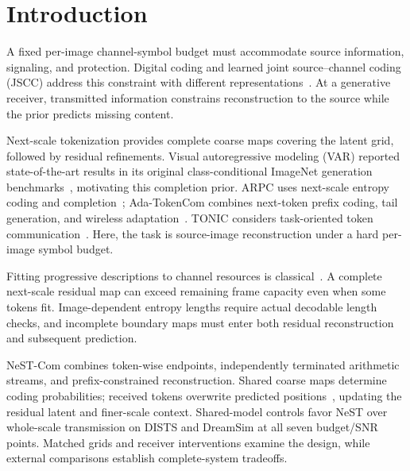 \section{Introduction}
A fixed per-image channel-symbol budget must accommodate source information, signaling, and protection. Digital coding and learned joint source--channel coding (JSCC) address this constraint with different representations~\cite{deepjscc,swinjscc}. At a generative receiver, transmitted information constrains reconstruction to the source while the prior predicts missing content.

Next-scale tokenization provides complete coarse maps covering the latent grid, followed by residual refinements. Visual autoregressive modeling (VAR) reported state-of-the-art results in its original class-conditional ImageNet generation benchmarks~\cite{var}, motivating this completion prior. ARPC uses next-scale entropy coding and completion~\cite{arpc}; Ada-TokenCom combines next-token prefix coding, tail generation, and wireless adaptation~\cite{adatokencom}. TONIC considers task-oriented token communication~\cite{tonic}. Here, the task is source-image reconstruction under a hard per-image symbol budget.

Fitting progressive descriptions to channel resources is classical~\cite{chande}. A complete next-scale residual map can exceed remaining frame capacity even when some tokens fit. Image-dependent entropy lengths require actual decodable length checks, and incomplete boundary maps must enter both residual reconstruction and subsequent prediction.

NeST-Com combines token-wise endpoints, independently terminated arithmetic streams, and prefix-constrained reconstruction. Shared coarse maps determine coding probabilities; received tokens overwrite predicted positions~\cite{var}, updating the residual latent and finer-scale context. Shared-model controls favor NeST over whole-scale transmission on DISTS and DreamSim at all seven budget/SNR points. Matched grids and receiver interventions examine the design, while external comparisons establish complete-system tradeoffs.
